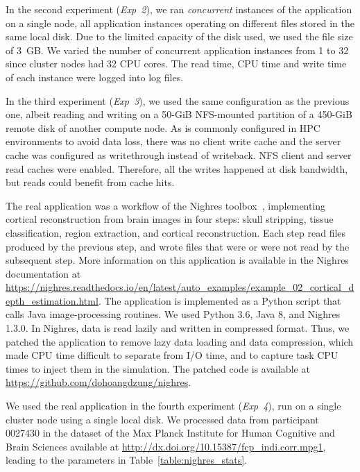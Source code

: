 In the second experiment (\textit{Exp~2}), we ran \emph{concurrent} instances 
of the application on a single node, all application instances operating on 
different files stored in the same local disk. Due to the limited capacity of 
the disk used, we used the file size of 3~GB. 
We varied the number of concurrent application instances from 1 to 32 
since cluster nodes had 32 CPU cores.
The read time, CPU time and write time of each instance were logged into 
log files. 

In the third experiment (\textit{Exp~3}), we used the same configuration as 
the previous one, albeit reading and writing on a 50-GiB NFS-mounted 
partition of a 450-GiB remote disk of another compute node. 
As is commonly configured in HPC environments to avoid data loss, 
there was no client write cache and the server cache was configured as 
writethrough instead of writeback. 
NFS client and server read caches were enabled. 
Therefore, all the writes happened at disk bandwidth, but reads could 
benefit from cache hits.

The real application was a workflow of the Nighres 
toolbox~\cite{huntenburg2018nighres}, implementing cortical reconstruction 
from brain images in four steps: skull stripping, tissue classification, 
region extraction, and cortical reconstruction. 
Each step read files produced by the previous step, and wrote files that 
were or were not read by the subsequent step.
More information on this application is available in the Nighres
documentation at
\url{https://nighres.readthedocs.io/en/latest/auto_examples/example_02_cortical_depth_estimation.html}.
The application is implemented as a Python script that calls Java
image-processing routines. We used Python 3.6, Java 8, and Nighres 1.3.0. 
In Nighres, data is read lazily and written in compressed format.
Thus, we patched the application to remove lazy data loading and data compression, 
which made CPU time difficult to separate from I/O time, and to capture task 
CPU times to inject them in the simulation. 
The patched code is available at \url{https://github.com/dohoangdzung/nighres}.

We used the real application in the fourth experiment (\textit{Exp~4}), 
run on a single cluster node using a single local disk. 
We processed data from participant 0027430 in the dataset of the 
Max Planck Institute for Human Cognitive and Brain Sciences available at
\url{http://dx.doi.org/10.15387/fcp_indi.corr.mpg1}, 
leading to the parameters in Table~\ref{table:nighres_stats}.

